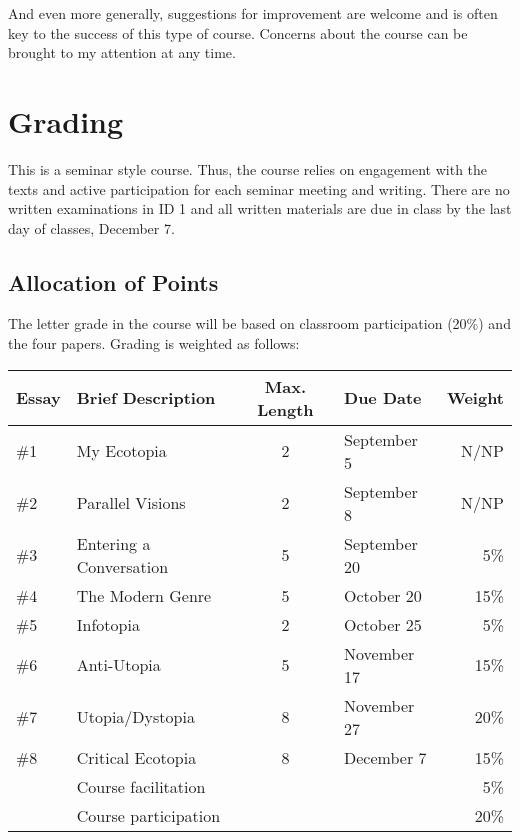 And even more generally, suggestions for improvement are welcome and is often key to the success of this type of course. Concerns about the course can be brought to my attention at any time. 

\section{Grading} 

This is a seminar style course. Thus, the course relies on engagement with the texts and active participation for each seminar meeting and writing. There are no written examinations in ID 1 and all written materials are due in class by the last day of classes, December 7. 

\subsection{Allocation of Points} 

The letter grade in the course will be based on classroom participation (20\%) and the four papers. Grading is weighted as follows:

\begin{table}
\begin{tabular}{llclr}\hline
Essay	& Brief Description	            & Max. Length	& Due Date	 & Weight \\\hline\hline
\#1	  & My Ecotopia	                  & 2	          & September 5	& N/NP \\
\#2	  & Parallel Visions              & 2           & September 8 & N/NP \\
\#3   & Entering a Conversation       & 5	          & September 20 & 	5\% \\
\#4   & The Modern Genre              & 5           & October 20  & 15\% \\
\#5   & Infotopia                     &	2	          & October 25	& 5\% \\
\#6	  & Anti-Utopia	                  & 5           &	November 17	 & 15\% \\
\#7	  & Utopia/Dystopia	              & 8           &	November 27	 & 20\% \\
\#8	  & Critical Ecotopia             & 8           &	December 7  & 15\% \\
    & Course facilitation	            &             &             &	5\% \\
    & Course participation	          &             &             & 20\% \\ \hline
\hline
\end{tabular}
\end{table}

